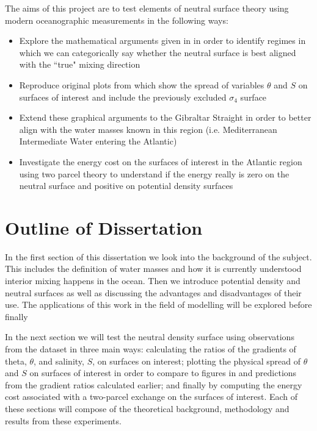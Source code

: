 The aims of this project are to test elements of neutral surface theory using modern oceanographic measurements in the following ways:

\begin{itemize}
    \item Explore the mathematical arguments given in \citet{McDougall1987} in order to identify regimes in which we can categorically say whether the neutral surface is best aligned with the ``true" mixing direction  
    
    \item Reproduce original plots from \citet{McDougall1987} which show the spread of variables $\theta$ and $S$ on surfaces of interest and include the previously excluded $\sigma_4$ surface
    
    \item Extend these graphical arguments to the Gibraltar Straight in order to better align with the water masses known in this region (i.e. Mediterranean Intermediate Water entering the Atlantic)
    
    \item Investigate the energy cost on the surfaces of interest in the Atlantic region using two parcel theory to understand if the energy really is zero on the neutral surface and positive on potential density surfaces
\end{itemize}

\section{Outline of Dissertation}

In the first section of this dissertation we look into the background of the subject. This includes the definition of water masses and how it is currently understood interior mixing happens in the ocean. Then we introduce potential density and neutral surfaces as well as discussing the advantages and disadvantages of their use. The applications of this work in the field of modelling will be explored before finally 

In the next section we will test the neutral density surface using observations from the \citet{WOCE2002} dataset in three main ways: calculating the ratios of the gradients of theta, $\theta$, and salinity, $S$, on surfaces on interest; plotting the physical spread of $\theta$ and $S$ on surfaces of interest in order to compare to figures in \citet{McDougall1987} and predictions from the gradient ratios calculated earlier; and finally by computing the energy cost associated with a two-parcel exchange on the surfaces of interest. Each of these sections will compose of the theoretical background, methodology and results from these experiments.

